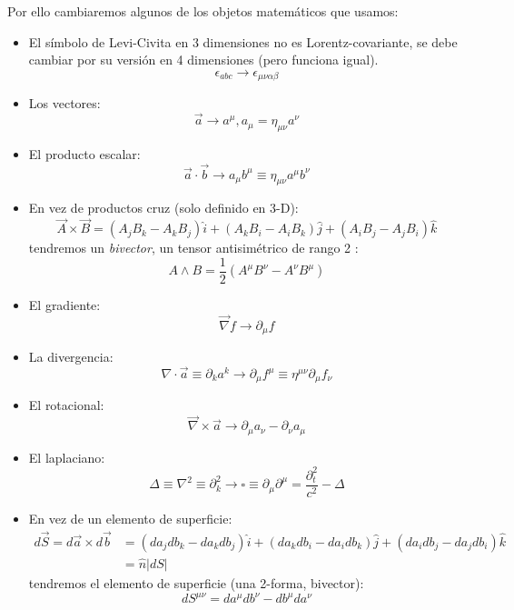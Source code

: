 \documentclass[]{article}
\numberwithin{equation}{section}
\begin{document}
Por ello cambiaremos algunos de los objetos matemáticos que usamos:
\begin{itemize}
	\item El símbolo de Levi-Civita en 3 dimensiones no es Lorentz-covariante, se debe cambiar por su versión en 4 dimensiones (pero funciona igual).
	\begin{equation}
		\epsilon_{abc} \rightarrow \epsilon_{\mu\nu\alpha\beta}
	\end{equation}
	\item Los vectores:
	\begin{equation}
		\vec{a} \rightarrow a^\mu, a_\mu = \eta_{\mu\nu}a^\nu
	\end{equation}
	\item El producto escalar:
	\begin{equation}
		\vec{a}\cdot\vec{b} \rightarrow a_\mu b^\mu \equiv \eta_{\mu\nu}a^\mu b^\nu
	\end{equation}
	\item En vez de productos cruz (solo definido en 3-D):
	\begin{equation*}
		\vec{A}\times\vec{B} = (A_j B_k - A_k B_j)\hat{i} + (A_k B_i - A_i B_k)\hat{j} + (A_i B_j - A_j B_i)\hat{k}
	\end{equation*}
	tendremos un \textit{bivector}, un tensor antisimétrico de rango 2 :
	\begin{equation}
		A\wedge B = \frac{1}{2}(A^\mu B^\nu - A^\nu B^\mu)
	\end{equation}
	\item El gradiente:
	\begin{equation}
		\vec{\nabla} f \rightarrow \partial_\mu f
	\end{equation}
	\item La divergencia:
	\begin{equation}
		\nabla\cdot\vec{a} \equiv \partial_k a^k \rightarrow \partial_\mu f^\mu \equiv \eta^{\mu\nu}\partial_\mu f_\nu
	\end{equation}
	\item El rotacional:
	\begin{equation}
		\vec{\nabla}\times\vec{a} \rightarrow \partial_\mu a_\nu - \partial_\nu a_\mu
	\end{equation}
	\item El laplaciano:
	\begin{equation}
		\Delta \equiv \nabla^2 \equiv \partial_k^2 \rightarrow \square \equiv \partial_\mu\partial^\mu = \frac{\partial_t^2}{c^2} - \Delta
	\end{equation}
	\item En vez de un elemento de superficie:
	\begin{align*}
	d\vec{S} = d\vec{a} \times d\vec{b} &= (da_j db_k - da_k db_j)\hat{i} + (da_k db_i - da_i db_k)\hat{j} + (da_i db_j - da_j db_i)\hat{k}\\
	&= \hat{n}\left|dS\right| 
	\end{align*}
	tendremos el elemento de superficie (una 2-forma, bivector):
	\begin{equation}
	dS^{\mu\nu} = da^\mu db^\nu - db^\mu da^\nu
	\end{equation}
\end{itemize}
\end{document}
